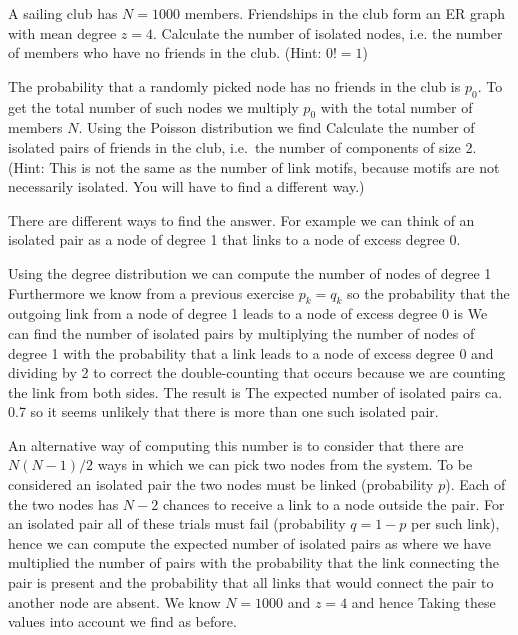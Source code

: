 A sailing club has $N=1000$ members. Friendships in the club form an ER graph with mean degree $z=4$. 
\subquestion 
Calculate the number of isolated nodes, i.e. the number of members who have no friends in the club. (Hint: $0!=1$)

\solution
The probability that a randomly picked node has no friends in the club is $p_0$. To get the total number of such nodes we multiply $p_0$ with the total number of members $N$.  Using the Poisson distribution we find
\subquestion 
Calculate the number of isolated pairs of friends in the club, i.e.~the number of components of size 2. (Hint: This is not the same as the number of link motifs, because motifs are not necessarily isolated. You will have to find a different way.) 

\solution
There are different ways to find the answer. For example we can think of an isolated pair as a node of degree 1 that links to a node of excess degree 0.

Using the degree distribution we can compute the number of nodes of degree 1
Furthermore we know from a previous exercise $p_k=q_k$ so the probability that the outgoing link from a node of degree 1 leads to a node of excess degree 0 is 
We can find the number of isolated pairs by multiplying the number of nodes of degree 1 with the probability that a link leads to a node of excess degree 0 and dividing by 2 to correct the double-counting that occurs because we are counting the link from both sides. The result is 
The expected number of isolated pairs ca. 0.7 so it seems unlikely that there is more than one such isolated pair. 

An alternative way of computing this number is to consider that there are $N(N-1)/2$ ways in which we can pick two nodes from the system. To be considered an isolated pair the two nodes must be linked (probability $p$). Each of the two nodes has $N-2$ chances to receive a link to a node outside the pair. For an isolated pair all of these trials must fail (probability $q=1-p$ per such link), hence we can compute the expected number of isolated pairs as
where we have multiplied the number of pairs with the probability that the link connecting the pair is present and the probability that all links that would connect the pair to another node are absent. 
We know $N=1000$ and $z=4$ and hence 
Taking these values into account we find 
as before.

